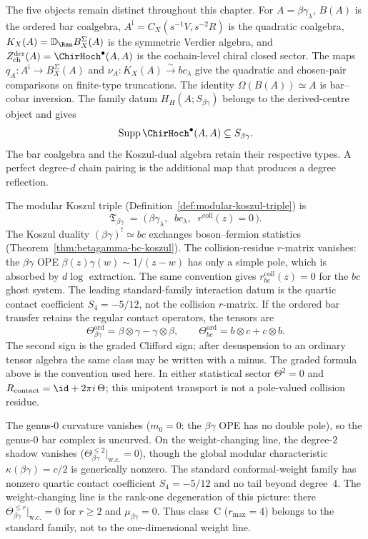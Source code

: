 \noindent
The five objects remain distinct throughout this chapter. For
$A=\beta\gamma_\lambda$, $B(A)$ is the ordered bar coalgebra,
$A^{\mathrm{i}}=C_X(s^{-1}V,s^{-2}R)$ is the quadratic coalgebra,
$K_X(A)=\mathbb D_{\Ran}B_X^\Sigma(A)$ is the symmetric Verdier
algebra, and
$Z^{\mathrm{der}}_{\mathrm{ch}}(A)=\ChirHoch^\bullet(A,A)$ is the
cochain-level chiral closed sector.  The maps
$q_A\colon A^{\mathrm i}\to B_X^\Sigma(A)$ and
$\nu_A\colon K_X(A)\xrightarrow{\sim}bc_\lambda$ give the quadratic
and chosen-pair comparisons on finite-type truncations.  The identity
$\Omega(B(A))\simeq A$ is bar--cobar inversion.  The family datum
$H_H(A;S_{\beta\gamma})$ belongs to the derived-centre object and gives
\[
 \operatorname{Supp}\ChirHoch^\bullet(A,A)
 \subseteq S_{\beta\gamma}.
\]
The bar coalgebra and the Koszul-dual algebra retain their respective
types.  A perfect degree-$d$ chain pairing is the additional map that
produces a degree reflection.

\noindent
The modular Koszul triple
(Definition~\ref{def:modular-koszul-triple}) is
\begin{equation}\label{eq:betagamma-triple-ch}
\mathfrak{T}_{\beta\gamma}
\;=\;
\bigl(\,\beta\gamma_\lambda,\;\;
bc_\lambda,\;\;
r^{\mathrm{coll}}(z) = 0\,\bigr).
\end{equation}
The Koszul duality $(\beta\gamma)^! \simeq bc$ exchanges
boson--fermion statistics
(Theorem~\ref{thm:betagamma-bc-koszul}). The collision-residue
$r$-matrix vanishes: the $\beta\gamma$ OPE
$\beta(z)\gamma(w) \sim 1/(z{-}w)$ has only a simple pole,
which is absorbed by $d\log$ extraction. The same convention gives
$r^{\mathrm{coll}}_{bc}(z)=0$ for the $bc$ ghost system. The leading
standard-family interaction datum is the quartic contact coefficient
$S_4=-5/12$, not the collision $r$-matrix. If the ordered bar
transfer retains the regular contact operators, the tensors are
\[
\Theta_{\beta\gamma}^{\mathrm{ord}}
=\beta\otimes\gamma-\gamma\otimes\beta,
\qquad
\Theta_{bc}^{\mathrm{ord}}
=b\otimes c+c\otimes b .
\]
The second sign is the graded Clifford sign; after desuspension to an
ordinary tensor algebra the same class may be written with a minus.
The graded formula above is the convention used here. In either
statistical sector $\Theta^2=0$ and
$R_{\mathrm{contact}}=\id+2\pi i\,\Theta$; this unipotent transport
is not a pole-valued collision residue.

The genus-$0$ curvature vanishes ($m_0 = 0$: the $\beta\gamma$ OPE
has no double pole), so the genus-$0$ bar complex is uncurved.
On the weight-changing line, the degree-$2$ shadow vanishes
($\Theta_{\beta\gamma}^{\leq 2}\big|_{\mathrm{w.c.}} = 0$),
though the global modular characteristic
$\kappa(\beta\gamma) = c/2$ is generically nonzero.
The standard conformal-weight family has nonzero quartic contact
coefficient $S_4=-5/12$ and no tail beyond degree~$4$. The
weight-changing line is the rank-one degeneration of this picture:
there $\Theta_{\beta\gamma}^{\le r}|_{\mathrm{w.c.}}=0$ for
$r\ge2$ and $\mu_{\beta\gamma}=0$. Thus class~C
($r_{\max}=4$) belongs to the standard family, not to the
one-dimensional weight line.

